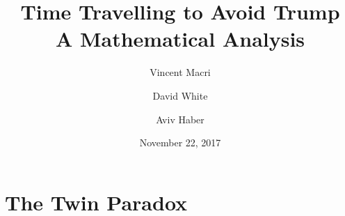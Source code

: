 \documentclass[letterpaper,12pt]{report}
\title{\Huge Time Travelling to Avoid Trump\\\LARGE A Mathematical Analysis}
\author{Vincent Macri \and David White \and Aviv Haber}
\date{November 22, 2017}
\begin{document}
	\maketitle
	
	\tableofcontents
	\clearpage
	\part{The Twin Paradox}
		\label{part:twinParadox}
		
		
	\printbibliography
\end{document}
